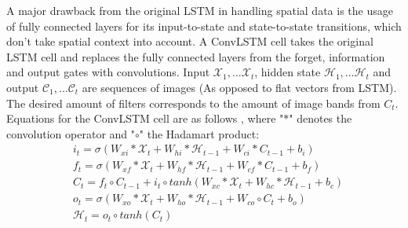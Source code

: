 A major drawback from the original LSTM in handling spatial data is the usage of fully connected layers for its input-to-state and state-to-state transitions, which don't take spatial context into account. A ConvLSTM cell takes the original LSTM cell and replaces the fully connected layers from the forget, information and output gates with convolutions. Input $\mathcal{X}_1,...\mathcal{X}_t$, hidden state $\mathcal{H}_1,...\mathcal{H}_t$ and output $\mathcal{C}_1,...\mathcal{C}_t$ are sequences of images (As opposed to flat vectors from LSTM). The desired amount of filters corresponds to the amount of image bands from $C_t$. Equations for the ConvLSTM cell are as follows \cite{convlstm}, where "$\ast$" denotes the convolution operator and "$\circ$" the Hadamart product:
\begin{align*}
& i_t=\sigma (W_{xi} \ast \mathcal{X}_t+W_{hi} \ast \mathcal{H}_{t-1} + W_{ci} \ast C_{t-1}+b_i) \\
& f_t=\sigma (W_{xf} \ast \mathcal{X}_t+W_{hf} \ast \mathcal{H}_{t-1} + W_{cf} \ast C_{t-1}+b_f) \\
& C_t=f_t\circ C_{t-1}+i_t\circ tanh(W_{xc} \ast \mathcal{X}_t+W_{hc} \ast \mathcal{H}_{t-1}+b_c) \\
& o_t=\sigma (W_{xo} \ast \mathcal{X}_t+W_{ho} \ast \mathcal{H}_{t-1} + W_{co} \circ C_{t}+b_o) \\
& \mathcal{H}_t=o_t\circ tanh(C_t)
\end{align*}